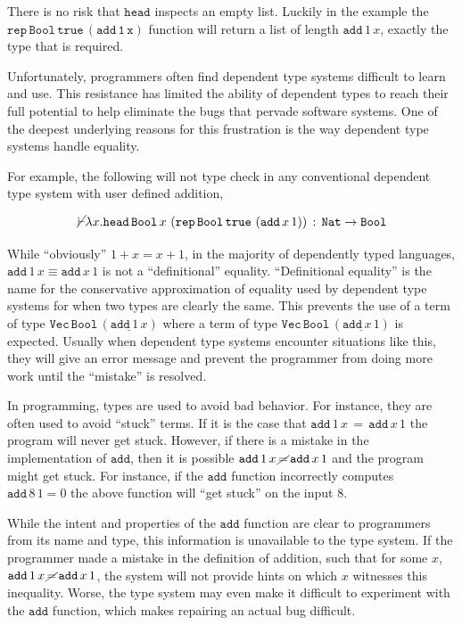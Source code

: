 There is no risk that $\mathtt{head}$ inspects an empty list.
Luckily in the example the $\mathtt{\mathtt{rep}\,\mathtt{Bool}\,\mathtt{true}\,\left(\mathtt{add}\,1\,x\right)}$ function will return a list of length $\mathtt{add}\,1\,x$, exactly the type that is required.


Unfortunately, programmers often find dependent type systems difficult to learn and use.
This resistance has limited the ability of dependent types to reach their full potential to help eliminate the bugs that pervade software systems.
One of the deepest underlying reasons for this frustration is the way dependent type systems handle equality.

For example, the following will not type check in any conventional dependent type system with user defined addition,

\[
\cancel{\vdash}\lambda x.\mathtt{head}\,\mathtt{Bool}\,x\,\left(\mathtt{rep}\,\mathtt{Bool}\,\mathtt{true}\,\left(\mathtt{add}\,x\,1\right)\right)\,:\,\mathtt{Nat}\rightarrow\mathtt{Bool}
\]

While ``obviously'' $1+x=x+1$, in the majority of dependently typed languages, $\mathtt{add}\,1\,x\equiv\mathtt{add}\,x\,1$ is not a ``definitional'' equality.
``Definitional equality'' is the name for the conservative approximation of equality used by dependent type systems for when two types are clearly the same.
This prevents the use of a term of type
$\mathtt{Vec}\,\mathtt{Bool}\,\left(\underline{\mathtt{add}\,1\,x}\right)$
where a term of type
$\mathtt{Vec}\,\mathtt{Bool}\,\left(\underline{\mathtt{add}\,x\,1}\right)$
is expected.
Usually when dependent type systems encounter situations like this, they will give an error message and prevent the programmer from doing more work until the ``mistake'' is resolved.

In programming, types are used to avoid bad behavior.
For instance, they are often used to avoid ``stuck'' terms.
If it is the case that $\mathtt{add}\,1\,x\,=\,\mathtt{add}\,x\,1$ the program will never get stuck.
However, if there is a mistake in the implementation of $\mathtt{add}$, then it is possible $\mathtt{add}\,1\,x\,\cancel{=}\,\mathtt{add}\,x\,1$ and the program might get stuck.
For instance, if the $\mathtt{add}$ function incorrectly computes $\mathtt{add}\,8\,1=0$ the above function will ``get stuck'' on the input $8$.

While the intent and properties of the $\mathtt{add}$ function are clear to programmers from its name and type, this information is unavailable to the type system.
If the programmer made a mistake in the definition of addition, such that for some $x$, $\mathtt{add}\,1\,x\,\cancel{=}\,\mathtt{add}\,x\,1$, the system will not provide hints on which $x$ witnesses this inequality.
Worse, the type system may even make it difficult to experiment with the $\mathtt{add}$ function, which makes repairing an actual bug difficult.

